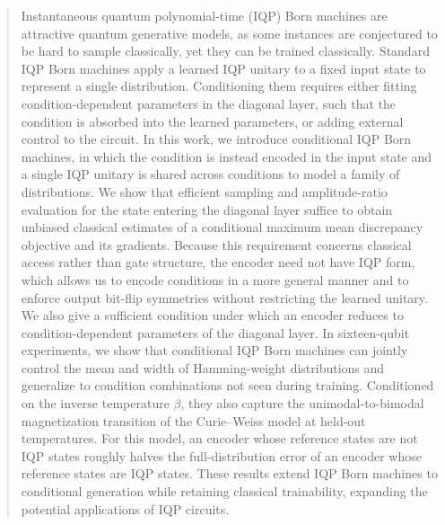 \documentclass[pra,aps,10pt,twocolumn,floatfix,superscriptaddress, notitlepage,longbibliography]{revtex4-2}
\begin{document}
\begin{abstract}
Instantaneous quantum polynomial-time (IQP) Born machines are attractive quantum generative models, as some instances are conjectured to be hard to sample classically, yet they can be trained classically. Standard IQP Born machines apply a learned IQP unitary to a fixed input state to represent a single distribution. Conditioning them requires either fitting condition-dependent parameters in the diagonal layer, such that the condition is absorbed into the learned parameters, or adding external control to the circuit. In this work, we introduce conditional IQP Born machines, in which the condition is instead encoded in the input state and a single IQP unitary is shared across conditions to model a family of distributions. We show that efficient sampling and amplitude-ratio evaluation for the state entering the diagonal layer suffice to obtain unbiased classical estimates of a conditional maximum mean discrepancy objective and its gradients. Because this requirement concerns classical access rather than gate structure, the encoder need not have IQP form, which allows us to encode conditions in a more general manner and to enforce output bit-flip symmetries without restricting the learned unitary. We also give a sufficient condition under which an encoder reduces to condition-dependent parameters of the diagonal layer. In sixteen-qubit experiments, we show that conditional IQP Born machines can jointly control the mean and width of Hamming-weight distributions and generalize to condition combinations not seen during training. Conditioned on the inverse temperature $\beta$, they also capture the unimodal-to-bimodal magnetization transition of the Curie--Weiss model at held-out temperatures. For this model, an encoder whose reference states are not IQP states roughly halves the full-distribution error of an encoder whose reference states are IQP states. These results extend IQP Born machines to conditional generation while retaining classical trainability, expanding the potential applications of IQP circuits.
\end{abstract}
\maketitle
\raggedbottom
\end{document}
